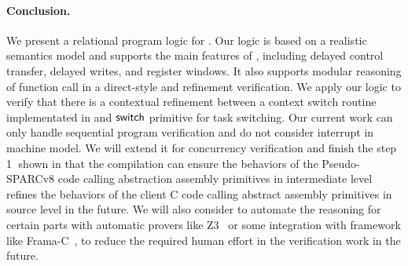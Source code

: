 \paragraph{\textbf{Conclusion.}}
We present a relational program logic for \sparc.
Our logic is based on a realistic semantics
model and supports the main features of \sparc,
including delayed control transfer, delayed writes,
and register windows.
It also supports modular reasoning of 
function call in a direct-style and 
refinement verification. 
We apply our logic to verify  
that there is a contextual refinement between 
a context switch routine implementated 
in \sparc{} and $\mathsf{switch}$ primitive for task switching.
Our current work can only handle
sequential \sparc{} program verification and 
do not consider interrupt in machine model.  
We will extend it for concurrency verification 
and finish the step {\color{blue} \textcircled{1}} shown in
\Fig{\ref{fig:idea to establish contextual refinement}}
that the compilation can ensure the behaviors 
of the Pseudo-SPARCv8 code calling abstraction assembly 
primitives in intermediate level refines 
the behaviors of 
the client C code calling abstract assembly primitives 
in source level in the future. 
{\color{blue}
We will also consider to automate the reasoning  
for certain parts with automatic provers like Z3~\cite{Z3} 
or some integration with framework like Frama-C~\cite{framac}, to 
reduce the required human effort in the verification work 
in the future. 
}